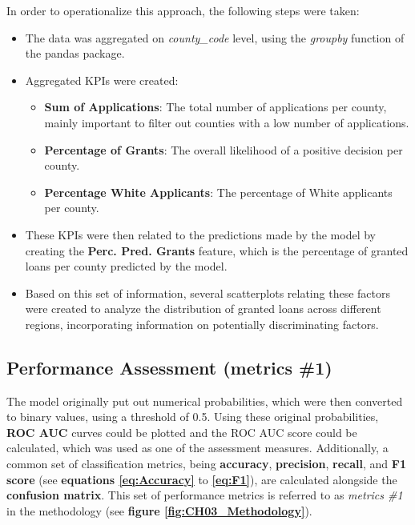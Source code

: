 In order to operationalize this approach, the following steps were taken:
\begin{itemize}
    \item The data was aggregated on \textit{county\_code} level, using the \textit{groupby} function of the pandas package.
    \item Aggregated KPIs were created: 
    \begin{itemize}
        \item \textbf{Sum of Applications}: The total number of applications per county, mainly important to filter out counties with a low number of applications.
        \item \textbf{Percentage of Grants}: The overall likelihood of a positive decision per county.
        \item \textbf{Percentage White Applicants}: The percentage of White applicants per county.
    \end{itemize}
    \item These KPIs were then related to the predictions made by the model by creating the \textbf{Perc. Pred. Grants} feature, which is the percentage of granted loans per county predicted by the model.
    \item Based on this set of information, several scatterplots relating these factors were created to analyze the distribution of granted loans across different regions, incorporating information on potentially discriminating factors. 
\end{itemize}

\subsection{Performance Assessment (metrics \#1)}\label{subsec:Performance_Assessment}

The model originally put out numerical probabilities, which were then converted to binary values, using a threshold of 0.5.
Using these original probabilities, \textbf{ROC AUC} curves could be plotted and the ROC AUC score could be calculated, which was used as one of the assessment measures.
Additionally, a common set of classification metrics, being \textbf{accuracy}, \textbf{precision}, \textbf{recall}, and \textbf{F1 score} (see \textbf{equations \ref{eq:Accuracy}} to \textbf{\ref{eq:F1}}), are calculated alongside the \textbf{confusion matrix}.
This set of performance metrics is referred to as \textit{metrics \#1} in the methodology (see \textbf{figure \ref{fig:CH03_Methodology}}).

